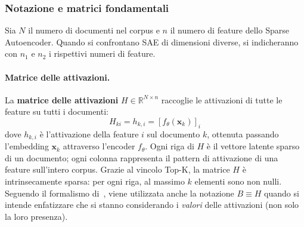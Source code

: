 \subsubsection{Notazione e matrici fondamentali}
\label{subsubsec:notation_matrices}
Sia $N$ il numero di documenti nel corpus e $n$ il numero di feature dello Sparse Autoencoder. Quando si confrontano SAE di dimensioni diverse, si indicheranno con $n_1$ e $n_2$ i rispettivi numeri di feature.
\paragraph{Matrice delle attivazioni.} La \textbf{matrice delle attivazioni} $H \in \mathbb{R}^{N \times n}$ raccoglie le attivazioni di tutte le feature su tutti i documenti:
\begin{equation}
    H_{ki} = h_{k,i} = \left[ f_\theta(\mathbf{x}_k) \right]_i
    \label{eq:activation_matrix}
\end{equation}
dove $h_{k,i}$ è l'attivazione della feature $i$ sul documento $k$, ottenuta passando l'embedding $\mathbf{x}_k$ attraverso l'encoder $f_\theta$. Ogni riga di $H$ è il vettore latente sparso di un documento; ogni colonna rappresenta il pattern di attivazione di una feature sull'intero corpus.
Grazie al vincolo Top-K, la matrice $H$ è intrinsecamente sparsa: per ogni riga, al massimo $k$ elementi sono non nulli. Seguendo il formalismo di~\parencite{oneill2024disentangling}, viene utilizzata anche la notazione $B \equiv H$ quando si intende enfatizzare che si stanno considerando i \textit{valori} delle attivazioni (non solo la loro presenza).
